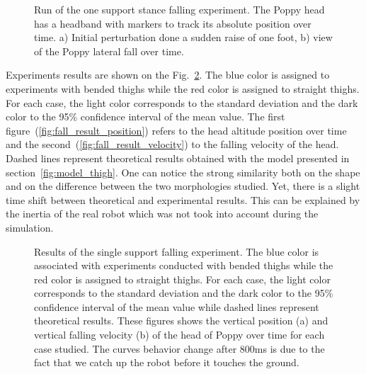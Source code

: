 \begin{figure}[h]
\centering
    \hfil
    \caption{Run of the one support stance falling experiment.
    The Poppy head has a headband with markers to track its absolute position over time.
     a) Initial perturbation done a sudden raise of one foot, b) view of the Poppy lateral fall over time.}
    \label{fig:falling_experiment}
\end{figure}

Experiments results are shown on the Fig.~\ref{fig:falling_results}. The blue color is assigned to experiments with bended thighs while the red color is assigned to straight thighs. For each case, the light color corresponds to the standard deviation and the dark color to the 95\% confidence interval of the mean value. The first figure~(\ref{fig:fall_result_position}) refers to the head altitude position over time and the second~(\ref{fig:fall_result_velocity}) to the falling velocity of the head. Dashed lines represent theoretical results obtained with the model presented in section~\ref{fig:model_thigh}. One can notice the strong similarity both on the shape and on the difference between the two morphologies studied. Yet, there is a slight time shift between theoretical and experimental results. This can be explained by the inertia of the real robot which was not took into account during the simulation.

\begin{figure}[h]
\centering
    \hfil
    \caption{Results of the single support falling experiment.
    The blue color is associated with experiments conducted with bended thighs while the red color is assigned to straight thighs.
    For each case, the light color corresponds to the standard deviation and the dark color to the 95\% confidence interval of the mean value while dashed lines represent theoretical results.
    These figures shows the vertical position (a) and vertical falling velocity (b) of the head of Poppy over time for each case studied.
    The curves behavior change after 800ms is due to the fact that we catch up the robot before it touches the ground.}
    \label{fig:falling_results}
\end{figure}

